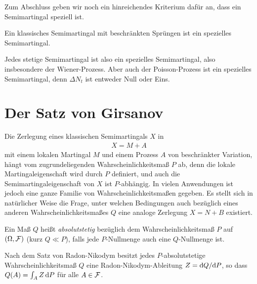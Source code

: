 Zum Abschluss geben wir noch ein hinreichendes Kriterium dafür an, dass ein
Semimartingal speziell ist.

\begin{theorem}
\label{prop:3.6}
Ein klassisches Semimartingal mit beschränkten Sprüngen ist ein spezielles
Semimartingal.\fish
\end{theorem}

Jedes stetige Semimartingal ist also ein spezielles Semimartingal, also
insbesondere der Wiener-Prozess. Aber auch der Poisson-Prozess ist ein
spezielles Semimartingal, denn $\Delta N_t$ ist entweder Null oder Eins.

\section{Der Satz von Girsanov}

Die Zerlegung eines klassischen Semimartingals $X$ in
\begin{align*}
X = M+A
\end{align*}
mit einem lokalen Martingal $M$ und einem Prozess $A$ von beschränkter
Variation, hängt vom zugrundeliegenden Wahrscheinlichkeitsmaß $P$ ab, denn die
lokale Martingaleigenschaft wird durch $P$ definiert, und auch die
Semimartingaleigenschaft von $X$ ist $P$-abhängig. In vielen Anwendungen ist
jedoch eine ganze Familie von Wahrscheinlichkeitsmaßen gegeben. Es stellt
sich in natürlicher Weise die Frage, unter welchen Bedingungen auch
bezüglich eines anderen Wahrscheinlichkeitsmaßes $Q$ eine analoge Zerlegung
$X=N+B$ existiert.

\begin{defn*}
Ein Maß $Q$ heißt \emph{absolutstetig} bezüglich dem Wahrscheinlichkeitsmaß $P$
auf $(\Omega,\mathcal{F})$ (kurz $Q \ll P$), falls jede $P$-Nullmenge auch eine
$Q$-Nullmenge ist.\fish
\end{defn*}

Nach dem Satz von Radon-Nikodym besitzt jedes $P$-absolutstetige
Wahrscheinlichkeitsmaß $Q$ eine Radon-Nikodym-Ableitung $Z=\mathrm{d} Q/\mathrm{d} P$, so dass
$Q(A)=\int_A Z\, \mathrm{d} P$ für alle $A \in \mathcal{F}$.

